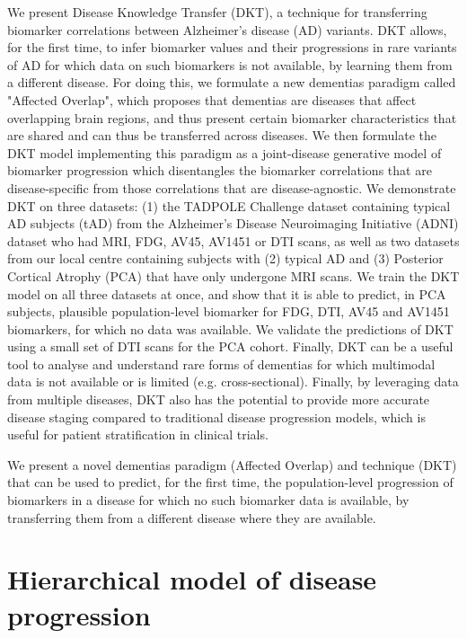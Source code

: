 \documentclass[11pt,a4paper]{article}
\begin{document}
We present Disease Knowledge Transfer (DKT), a technique for transferring biomarker correlations between Alzheimer's disease (AD) variants. DKT allows, for the first time, to infer biomarker values and their progressions in rare variants of AD for which data on such biomarkers is not available, by learning them from a different disease. For doing this, we formulate a new dementias paradigm called "Affected Overlap", which proposes that dementias are diseases that affect overlapping brain regions, and thus present certain biomarker characteristics that are shared and can thus be transferred across diseases. We then formulate the DKT model implementing this paradigm as a joint-disease generative model of biomarker progression which disentangles the biomarker correlations that are disease-specific from those correlations that are disease-agnostic. We demonstrate DKT on three datasets: (1) the TADPOLE Challenge dataset containing typical AD subjects (tAD) from the Alzheimer's Disease Neuroimaging Initiative (ADNI) dataset who had MRI, FDG, AV45, AV1451 or DTI scans, as well as two datasets from our local centre containing subjects with (2) typical AD and (3) Posterior Cortical Atrophy (PCA) that have only undergone MRI scans. We train the DKT model on all three datasets at once, and show that it is able to predict, in PCA subjects, plausible population-level biomarker for FDG, DTI, AV45 and AV1451 biomarkers, for which no data was available. We validate the predictions of DKT using a small set of DTI scans for the PCA cohort. Finally, DKT can be a useful tool to analyse and understand rare forms of dementias for which multimodal data is not available or is limited (e.g. cross-sectional). Finally, by leveraging data from multiple diseases, DKT also has the potential to provide more accurate disease staging compared to traditional disease progression models, which is useful for patient stratification in clinical trials.



We present a novel dementias paradigm (Affected Overlap) and technique (DKT) that can be used to predict, for the first time, the population-level progression of biomarkers in a disease for which no such biomarker data is available, by transferring them from a different disease where they are available.



\section{Hierarchical model of disease progression}
\end{document}

